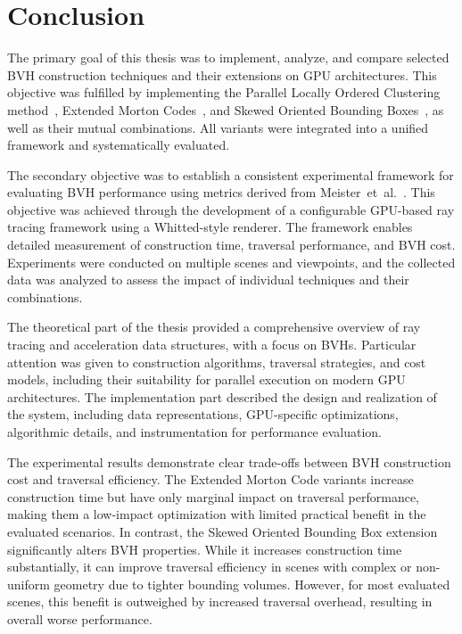 \chapter{Conclusion}
\label{chap:conclusion}

The primary goal of this thesis was to implement, analyze, and compare selected BVH construction techniques and their extensions on GPU architectures. This objective was fulfilled by implementing the Parallel Locally Ordered Clustering method~\cite{MB17}, Extended Morton Codes~\cite{Vinkler2017}, and Skewed Oriented Bounding Boxes~\cite{KB25}, as well as their mutual combinations. All variants were integrated into a unified framework and systematically evaluated.

The secondary objective was to establish a consistent experimental framework for evaluating BVH performance using metrics derived from Meister~et~al.~\cite{MB22}. This objective was achieved through the development of a configurable GPU-based ray tracing framework using a Whitted-style renderer. The framework enables detailed measurement of construction time, traversal performance, and BVH cost. Experiments were conducted on multiple scenes and viewpoints, and the collected data was analyzed to assess the impact of individual techniques and their combinations.

The theoretical part of the thesis provided a comprehensive overview of ray tracing and acceleration data structures, with a focus on BVHs. Particular attention was given to construction algorithms, traversal strategies, and cost models, including their suitability for parallel execution on modern GPU architectures. The implementation part described the design and realization of the system, including data representations, GPU-specific optimizations, algorithmic details, and instrumentation for performance evaluation.

The experimental results demonstrate clear trade-offs between BVH construction cost and traversal efficiency. The Extended Morton Code variants increase construction time but have only marginal impact on traversal performance, making them a low-impact optimization with limited practical benefit in the evaluated scenarios. In contrast, the Skewed Oriented Bounding Box extension significantly alters BVH properties. While it increases construction time substantially, it can improve traversal efficiency in scenes with complex or non-uniform geometry due to tighter bounding volumes. However, for most evaluated scenes, this benefit is outweighed by increased traversal overhead, resulting in overall worse performance.

